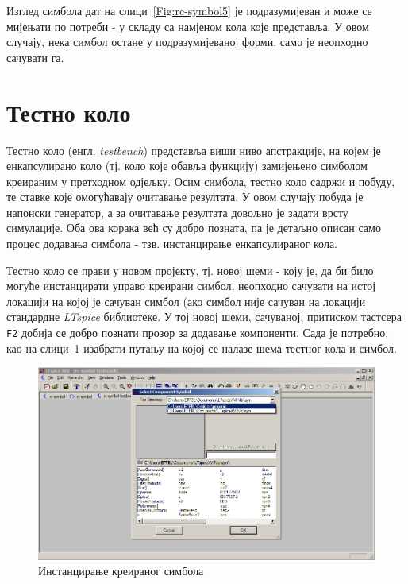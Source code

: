 Изглед симбола дат на слици~\ref{Fig:rc-symbol5} је подразумијеван и може се мијењати по потреби - у складу са намјеном кола које представља. У овом случају, нека симбол остане у подразумијеваној форми, само је неопходно сачувати га.

\section{Тестно коло}

Тестно коло (енгл. \textit{testbench}) представља виши ниво апстракције, на којем је енкапсулирано коло (тј. коло које обавља функцију) замијењено симболом креираним у претходном одјељку. Осим симбола, тестно коло садржи и побуду, те ставке које омогућавају очитавање резултата. У овом случају побуда је напонски генератор, а за очитавање резултата довољно је задати врсту симулације. Оба ова корака већ су добро позната, па је детаљно описан само процес додавања симбола - тзв. инстанцирање енкапсулираног кола.

Тестно коло се прави у новом пројекту, тј. новој шеми - коју је, да би било могуће инстанцирати управо креирани симбол, неопходно сачувати на истој локацији на којој је сачуван симбол (ако симбол није сачуван на локацији стандардне \textit{LTspice} библиотеке. У тој новој шеми, сачуваној, притиском тастсера \texttt{F2} добија се добро познати прозор за додавање компоненти. Сада је потребно, као на слици~\ref{Fig:rc-symbol6} изабрати путању на којој се налазе шема тестног кола и симбол.

\begin{figure}[h]
\centering
\includegraphics[width=\figwidth\textwidth]{figs/rc-symbol6.PNG}
\caption{Инстанцирање креираног симбола}
\label{Fig:rc-symbol6}
\end{figure}

